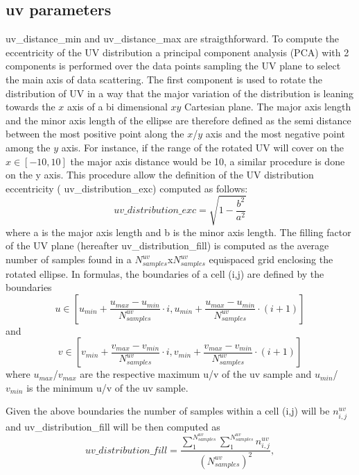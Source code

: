 \documentclass[11pt,a4paper]{ivoa}
\begin{document}
\subsection{uv parameters}
uv\_distance\_min and uv\_distance\_max are straigthforward.
To compute the eccentricity of the UV distribution a principal component analysis (PCA) with 2 components is performed over the data points sampling the UV plane to select the main axis of data scattering. The first component is used to rotate the distribution of UV in a way that the major variation of the distribution is leaning towards the $x$ axis of a bi dimensional $xy$ Cartesian plane. The major axis length and the minor axis length of the ellipse are therefore defined as the semi distance between the most positive point along the $x$/$y$ axis and the most negative point among the $y$ axis. For instance, if the range of the rotated UV will cover on the $x \in [-10, 10]$ the major axis distance would be 10, a similar procedure is done on the y axis. This procedure allow the definition of the UV distribution eccentricity (
uv\_distribution\_exc) computed as follows:
\begin{equation}
uv\_distribution\_exc = \sqrt{1-\frac{b^2}{a^2}}
\end{equation}
where a is the major axis length and b is the minor axis length.
The filling factor of the UV plane (hereafter uv\_distribution\_fill) is computed as the average number of samples found in a $N^{uv}_{samples}$x$N^{uv}_{samples}$ equispaced grid enclosing the rotated ellipse. In formulas,
 the boundaries of a cell (i,j) are defined by the boundaries
\begin{equation}
u \in [u_{min} + \frac{u_{max} - u_{min}}{N^{uv}_{samples}} \cdot i , u_{min} + \frac{u_{max} - u_{min}}{N^{uv}_{samples}} \cdot (i + 1)]
\end{equation} 
and
\begin{equation}
v \in [v_{min} + \frac{v_{max} - v_{min}}{N^{uv}_{samples}} \cdot i , v_{min} + \frac{v_{max} - v_{min}}{N^{uv}_{samples}} \cdot (i + 1)]
\end{equation} 
where $u_{max}$/$v_{max}$ are the respective maximum u/v of the uv sample and $u_{min}$/$v_{min}$ is the minimum u/v of the uv sample.

Given the above boundaries the number of samples within a cell (i,j) will be $n^{uv}_{i,j}$ and uv\_distribution\_fill will be then computed as 
\begin{equation}
uv\_distribution\_fill = \frac{\sum^{N^{uv}_{samples}}_1 \sum^{N^{uv}_{samples}}_{1} n^{uv}_{i,j} }{(N^{uv}_{samples}) ^ 2},
\end{equation}
\end{document}
